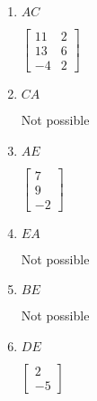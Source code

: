 \documentclass{ximera}
\begin{document}
\begin{problem}
\begin{enumerate}
\item $AC$

\begin{hint}
$\left[
\begin{array}{rr}
11 & 2 \\
13 & 6 \\
-4 & 2
\end{array}
\right]$
\end{hint}

\item $CA$

\begin{hint}
Not possible
\end{hint}

\item $AE$

\begin{hint}
$\left[
\begin{array}{r}
7 \\
9 \\
-2
\end{array}
\right]$
\end{hint}

\item $EA$

\begin{hint}
Not possible
\end{hint}

\item $BE$

\begin{hint}
Not possible
\end{hint}

\item $DE$

\begin{hint}
$\left[
\begin{array}{r}
2 \\
-5
\end{array}
\right]$
\end{hint}
\end{enumerate}
\end{problem}
\end{document}
